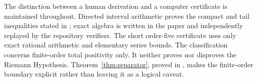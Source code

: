 The distinction between a human derivation and a computer certificate is
maintained throughout. Directed interval arithmetic proves the compact and
tail inequalities stated in ; exact algebra is written in
the paper and independently replayed by the repository verifiers. The short
order-five certificate uses only exact rational arithmetic and elementary
series bounds. The classification concerns finite-order total positivity
only. It neither proves nor disproves the Riemann Hypothesis.
Theorem~\ref{thm:separator}, proved in , makes the
finite-order boundary explicit rather than leaving it as a logical caveat.
